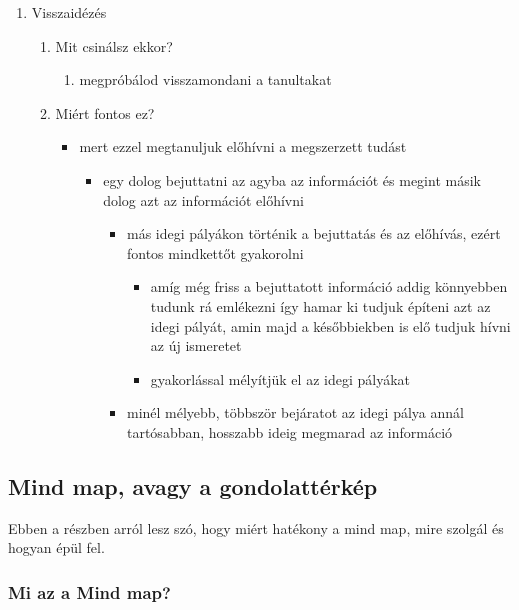 \documentclass[../Main.tex]{subfiles}
\begin{document}
\begin{enumerate}
    \item Visszaidézés
    \begin{enumerate}
        \item Mit csinálsz ekkor?
        \begin{enumerate}
            \item megpróbálod visszamondani a tanultakat
        \end{enumerate}
        \item Miért fontos ez?
        \begin{itemize}
            \item mert ezzel megtanuljuk előhívni a megszerzett tudást
            \begin{itemize}
                \item egy dolog bejuttatni az agyba az információt és megint másik dolog azt az információt előhívni
                \begin{itemize}
                    \item más idegi pályákon történik a bejuttatás és az előhívás, ezért fontos mindkettőt gyakorolni
                    \begin{itemize}
                        \item amíg még friss a bejuttatott információ addig könnyebben tudunk rá emlékezni így hamar ki
                         tudjuk építeni azt az idegi pályát, amin majd a későbbiekben is elő tudjuk hívni az új ismeretet
                        \item gyakorlással mélyítjük el az idegi pályákat
                    \end{itemize}
                    \item minél mélyebb, többször bejáratot az idegi pálya annál tartósabban, hosszabb ideig megmarad az információ
                \end{itemize}
            \end{itemize}
        \end{itemize}
    \end{enumerate}
\end{enumerate}


\subsection{Mind map, avagy a gondolattérkép}

Ebben a részben arról lesz szó, hogy miért hatékony a mind map, mire szolgál és hogyan épül fel.

\subsubsection{Mi az a Mind map?}
\end{document}
